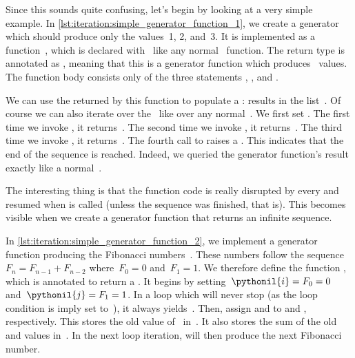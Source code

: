 Since this sounds quite confusing, let's begin by looking at a very simple example.
In \cref{lst:iteration:simple_generator_function_1}, we create a generator which should produce only the values~1, 2, and~3.
It is implemented as a function~, which is declared with~ like any normal \python\ function.
The return type is annotated as , meaning that this is a generator function which produces~ values.
The function body consists only of the three statements , , and .

We can use the  returned by this function to populate a :
 results in the list~\pythonil{[1, 2, 3]}.
Of course we can also iterate over the~ like over any normal~.
We first set .
The first time we invoke , it returns~.
The second time we invoke , it returns~.
The third time we invoke , it returns~.
The fourth call to  raises a .
This indicates that the end of the sequence is reached.
Indeed, we queried the generator function's result exactly like a normal~.

The interesting thing is that the function code is really disrupted by every  and resumed when  is called (unless the sequence was finished, that is).
This becomes visible when we create a generator function that returns an infinite sequence.

In \cref{lst:iteration:simple_generator_function_2}, we implement a generator function producing the Fibonacci numbers~\cite{W2024MAWWR:FN,S2022FLAATIMEOLPBOC}.
These numbers follow the sequence~$F_n=F_{n-1} + F_{n-2}$ where~$F_0=0$ and~$F_1=1$.
We therefore define the function , which is annotated to return a .
It begins by setting~$\pythonil{i}=F_0=0$ and~$\pythonil{j}=F_1=1$.
In a  loop which will never stop (as the loop condition is imply set to~), it always yields~.
Then, assign  and  to  and , respectively.
This stores the old value of~ in~.
It also stores the sum of the old  and  values in~.
In the next loop iteration,  will then produce the next Fibonacci number.

